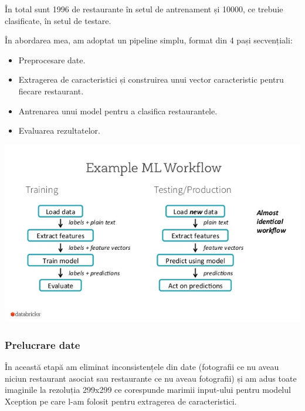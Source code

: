 În total sunt 1996 de restaurante în setul de antrenament și 10000, ce trebuie clasificate, în setul de testare.

În abordarea mea, am adoptat un pipeline simplu, format din 4 pași secvențiali:

\begin{itemize}
\item Preprocesare date.
\item Extragerea de caracteristici și construirea unui vector caracteristic pentru fiecare restaurant.
\item Antrenarea unui model pentru a clasifica restaurantele.
\item Evaluarea rezultatelor.
\end{itemize}

\begin{center}
\includegraphics[scale=0.6]{pipeline}
\end{center}

\subsubsection{Prelucrare date}
În această etapă am eliminat inconsistențele din date (fotografii ce nu aveau niciun restaurant asociat sau restaurante ce nu aveau fotografii) și am adus toate imaginile la rezoluția 299x299 ce corespunde marimii input-ului pentru modelul Xception pe care l-am folosit pentru extragerea de caracteristici.

